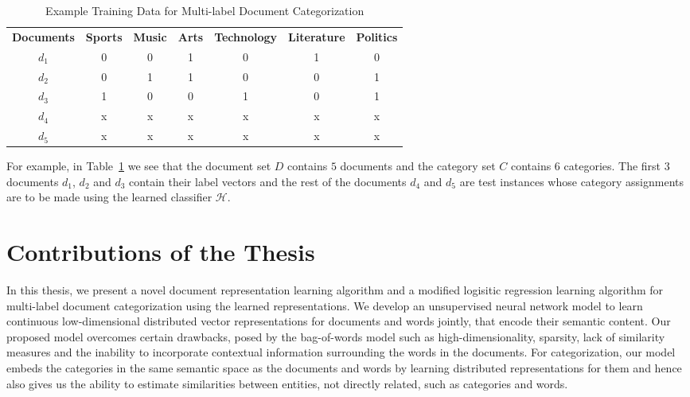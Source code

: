 \begin{table}[h!]
\tabcolsep=0.1cm
\footnotesize
\begin{center}
\begin{tabular}{c@{\hskip5mm} c c c c c c}
\toprule
\textbf{Documents}	&	\textbf{Sports} & \textbf{Music} & \textbf{Arts} & \textbf{Technology}  & \textbf{Literature} & \textbf{Politics}\\
\cmidrule{1-1}
\cmidrule{2-7}
$d_{1}$ & 0 & 0 & 1 & 0 & 1 & 0\\
$d_{2}$ & 0 & 1 & 1 & 0 & 0 & 1\\
$d_{3}$ & 1 & 0 & 0 & 1 & 0 & 1\\
$d_{4}$ & x & x & x & x & x & x\\
$d_{5}$ & x & x & x & x & x & x\\
\bottomrule         
\end{tabular}
\caption{\label{traindata:example:table}{Example Training Data for Multi-label Document Categorization}}
\end{center}
\end{table}

For example, in Table~\ref{traindata:example:table} we see that the document set $D$ contains $5$ documents and the category set $C$ contains $6$ categories. The first $3$ documents $d_{1}$, $d_{2}$ and $d_{3}$ contain their label vectors and the rest of the documents $d_{4}$ and $d_{5}$ are test instances whose category assignments are to be made using the learned classifier $\mathcal{H}$.

\section{Contributions of the Thesis}
In this thesis, we present a novel document representation learning algorithm and a modified logisitic regression learning algorithm for multi-label document categorization using the learned representations.
We develop an unsupervised neural network model to learn continuous low-dimensional distributed vector representations for documents and words jointly, that encode their semantic content. 
Our proposed model overcomes certain drawbacks, posed by the bag-of-words model such as high-dimensionality, sparsity, lack of similarity measures and the inability to incorporate contextual information surrounding the words in the documents. 
For categorization, our model embeds the categories in the same semantic space as the documents and words by learning distributed representations for them and hence also gives us the ability to estimate similarities between entities, not directly related, such as categories and words.


